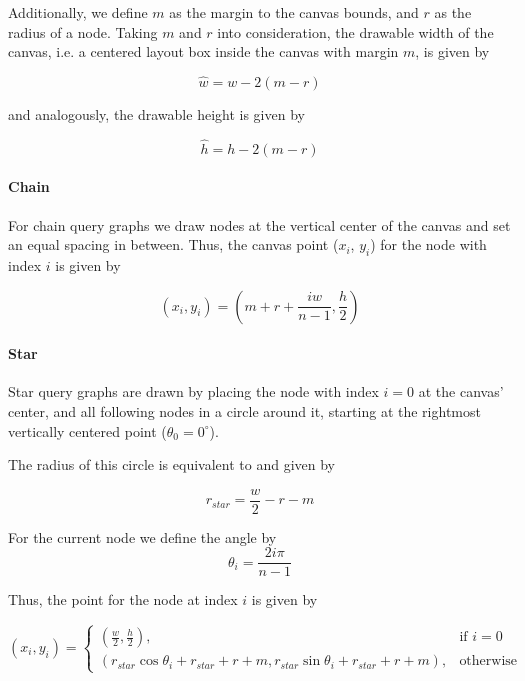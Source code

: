 Additionally, we define $m$ as the margin to the canvas bounds, and $r$ as the radius of a node.
Taking $m$ and $r$ into consideration, the drawable width of the canvas, i.e. a centered layout box inside the canvas with margin $m$, is given by 

\begin{equation}\label{eqn:painting-w_hat}
    \hat{w} = w - 2(m - r)
\end{equation}

and analogously, the drawable height is given by

\begin{equation}\label{eqn:painting-h_hat}
    \hat{h} = h - 2(m - r)    
\end{equation}

\paragraph{Chain} For chain query graphs we draw nodes at the vertical center of the canvas and set an equal spacing in between. Thus, the canvas point ($x_i$, $y_i$) for the node with index $i$ is given by


\begin{equation}
    (x_i, y_i) = (m + r + \frac{i\hat{w}}{n - 1}, \frac{h}{2})
\end{equation}

\paragraph{Star} 
Star query graphs are drawn by placing the node with index $i = 0$ at the canvas' center, and all following nodes in a circle around it, starting at the rightmost vertically centered point ($\theta_0 = 0^{\circ}$).

The radius of this circle is equivalent to %
and given by 

\begin{equation}\label{eqn:painting-r_star}
    r_{star} = \frac{w}{2} - r - m
\end{equation}

For the current node we define the angle by
\begin{equation}\label{eqn:painting-theta}
    \theta_i = \frac{2i\pi}{n - 1}
\end{equation}

Thus, the point for the node at index $i$ is given by

\begin{equation}
    (x_i, y_i) = 
    \begin{cases}
        (\frac{w}{2}, \frac{h}{2}),& \text{if } i = 0\\
        (r_{star}\cos{\theta_i} + r_{star} + r + m, r_{star}\sin{\theta_i} + r_{star} + r + m), & \text{otherwise}
    \end{cases}
\end{equation}

